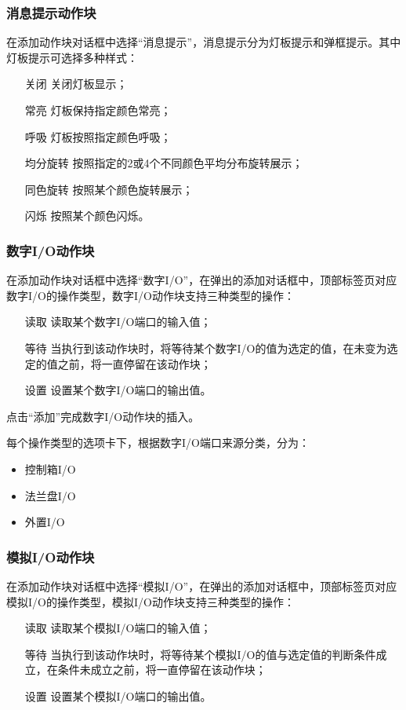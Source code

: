 \subsubsection{消息提示动作块}
在添加动作块对话框中选择“消息提示”，消息提示分为灯板提示和弹框提示。其中灯板提示可选择多种样式：
\begin{itemize}[font=\bfseries]
\item[关闭] 关闭灯板显示；
\item[常亮] 灯板保持指定颜色常亮；
\item[呼吸] 灯板按照指定颜色呼吸；
\item[均分旋转] 按照指定的2或4个不同颜色平均分布旋转展示；
\item[同色旋转] 按照某个颜色旋转展示；
\item[闪烁] 按照某个颜色闪烁。
\end{itemize}
\subsubsection{数字I/O动作块}
在添加动作块对话框中选择“数字I/O”，在弹出的添加对话框中，顶部标签页对应数字I/O的操作类型，数字I/O动作块支持三种类型的操作：
\begin{itemize}[font=\bfseries]
\item[读取] 读取某个数字I/O端口的输入值；
\item[等待] 当执行到该动作块时，将等待某个数字I/O的值为选定的值，在未变为选定的值之前，将一直停留在该动作块；
\item[设置] 设置某个数字I/O端口的输出值。
\end{itemize}

点击“添加”完成数字I/O动作块的插入。

每个操作类型的选项卡下，根据数字I/O端口来源分类，分为：
\begin{itemize}
	\item 控制箱I/O
	\item 法兰盘I/O
	\item 外置I/O
\end{itemize}


\subsubsection{模拟I/O动作块}
在添加动作块对话框中选择“模拟I/O”，在弹出的添加对话框中，顶部标签页对应模拟I/O的操作类型，模拟I/O动作块支持三种类型的操作：
\begin{itemize}[font=\bfseries]
\item[读取] 读取某个模拟I/O端口的输入值；
\item[等待] 当执行到该动作块时，将等待某个模拟I/O的值与选定值的判断条件成立，在条件未成立之前，将一直停留在该动作块；
\item[设置] 设置某个模拟I/O端口的输出值。
\end{itemize}

